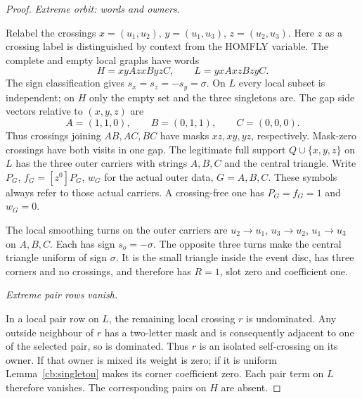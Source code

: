 \begin{proof}
\par\medskip\noindent\emph{Extreme orbit: words and owners.}\par
Relabel the crossings $x=(u_1,u_2)$, $y=(u_1,u_3)$,
$z=(u_2,u_3)$. Here $z$ as a crossing label is distinguished by
context from the HOMFLY variable. The complete and empty local graphs
have words
\begin{equation}\label{rtr:extreme-words}
 H=x y A z x B y z C,\qquad L=y x A x z B z y C.
\end{equation}
The sign classification gives $s_x=s_z=-s_y=\sigma$.
On $L$ every local subset is independent; on $H$ only the empty
set and the three singletons are. The gap side vectors relative to
$(x,y,z)$ are
\begin{equation}\label{rtr:extreme-masks}
 A=(1,1,0),\qquad B=(0,1,1),\qquad C=(0,0,0).
\end{equation}
Thus crossings joining $AB,AC,BC$ have masks $xz,xy,yz$,
respectively. Mask-zero crossings have both visits in one gap.
The legitimate full support $Q\cup\{x,y,z\}$ on $L$ has the three
outer carriers with strings $A,B,C$ and the central triangle. Write
$P_G$, $f_G=[z^0]P_G$, $w_G$ for the actual outer data, $G=A,B,C$.
These symbols always refer to those actual carriers. A crossing-free
one has $P_G=f_G=1$ and $w_G=0$.

The local smoothing turns on the outer carriers are $u_2\to u_1$,
$u_3\to u_2$, $u_1\to u_3$ on $A,B,C$. Each has sign
$s_o=-\sigma$. The opposite three turns make the central triangle
uniform of sign $\sigma$. It is the small triangle inside the event
disc, has three corners and no crossings, and therefore has
$R=1$, slot zero and coefficient one.

\par\medskip\noindent\emph{Extreme pair rows vanish.}\par
In a local pair row on $L$, the remaining local crossing $r$ is
undominated. Any outside neighbour of $r$ has a two-letter mask and
is consequently adjacent to one of the selected pair, so is dominated.
Thus $r$ is an isolated self-crossing on its owner. If that owner is
mixed its weight is zero; if it is uniform
Lemma~\ref{cb:singleton} makes its corner coefficient zero. Each
pair term on $L$ therefore vanishes. The corresponding pairs on $H$
are absent.


\end{proof}

